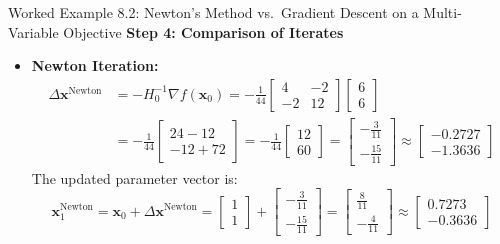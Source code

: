 \begin{examplebox}[breakable]{Worked Example 8.2: Newton's Method vs.\ Gradient Descent on a Multi-Variable Objective}
\textbf{Step 4: Comparison of Iterates}
\begin{itemize}
    \item \textbf{Newton Iteration:}
    \begin{align}
    \Delta \mathbf{x}^{\text{Newton}} &= -H_0^{-1} \nabla f(\mathbf{x}_0) = -\frac{1}{44} \begin{bmatrix} 4 & -2 \\ -2 & 12 \end{bmatrix} \begin{bmatrix} 6 \\ 6 \end{bmatrix} \nonumber \\
    &= -\frac{1}{44} \begin{bmatrix} 24 - 12 \\ -12 + 72 \end{bmatrix} = -\frac{1}{44} \begin{bmatrix} 12 \\ 60 \end{bmatrix} = \begin{bmatrix} -\frac{3}{11} \\ -\frac{15}{11} \end{bmatrix} \approx \begin{bmatrix} -0.2727 \\ -1.3636 \end{bmatrix}
    \end{align}
    The updated parameter vector is:
    \begin{equation}
    \mathbf{x}_1^{\text{Newton}} = \mathbf{x}_0 + \Delta \mathbf{x}^{\text{Newton}} = \begin{bmatrix} 1 \\ 1 \end{bmatrix} + \begin{bmatrix} -\frac{3}{11} \\ -\frac{15}{11} \end{bmatrix} = \begin{bmatrix} \frac{8}{11} \\ -\frac{4}{11} \end{bmatrix} \approx \begin{bmatrix} 0.7273 \\ -0.3636 \end{bmatrix}
    \end{equation}


\end{itemize}
\end{examplebox}
